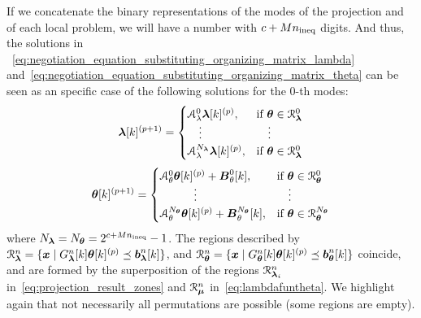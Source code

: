 \documentclass[../main.tex]{subfiles}
\begin{document}
If we concatenate the binary representations of the modes of the projection and of each local problem, we will have a number with $c+Mn_{\text{ineq}}$ digits.
And thus, the solutions in ~\eqref{eq:negotiation_equation_substituting_organizing_matrix_lambda} and~\eqref{eq:negotiation_equation_substituting_organizing_matrix_theta} can be seen as an specific case of the following solutions for the $0$-th modes:
\begin{equation}
  \label{eq:negotiation_equation_substituting_organizing_matrix_lambda_switched}
  \vec{\lambda}[k]\pplusone=
  \begin{cases}
    \mathcal{A}_{\lambda}^{0}\vec{\lambda}[k]\p,&\text{if}\ \vec{\theta} \in \set{R}_{\vec{\lambda}}^{0}\\
    \quad\vdots&\quad\vdots\\
    \mathcal{A}_{\lambda}^{N_{\vec{\lambda}}}\vec{\lambda}[k]\p,&\text{if}\ \vec{\theta}\in\set{R}_{\vec{\lambda}}^{0}\\
  \end{cases}
\end{equation}
\begin{equation}
  \label{eq:negotiation_equation_substituting_organizing_matrix_theta_switched}
  \vec{\theta}[k]\pplusone=
  \begin{cases}
    \mathcal{A}_{\theta}^{0}\vec{\theta}[k]\p+\mathcal{\vec{B}}_{\theta}^{0}[k],&\text{if}\ \vec{\theta}\in\set{R}_{\vec{\theta}}^{0}\\
    \qquad\quad \vdots&\quad \vdots\\
    \mathcal{A}_{\theta}^{N_{\vec{\theta}}}\vec{\theta}[k]\p+\mathcal{\vec{B}}_{\theta}^{N_{\vec{\theta}}}[k],&\text{if}\ \vec{\theta}\in\set{R}_{\vec{\theta}}^{N_{\vec{\theta}}}\\
  \end{cases}
\end{equation}
where $N_{\boldsymbol{\lambda}}=N_{\boldsymbol{\theta}}=2^{c+Mn_{\text{ineq}}}-1$.
The regions described by
 ${\mathcal{R}_{\boldsymbol{\lambda}}^{n}=\{\boldsymbol{x}\mid G_{\boldsymbol{\lambda}}^{n}[k]\boldsymbol{\theta}[k]^{(p)} \preceq \boldsymbol{b}_{\boldsymbol{\lambda}}^{n}[k]\}}$, and
 ${\mathcal{R}_{\boldsymbol{\theta}}^{n}=\{\boldsymbol{x}\mid G_{\boldsymbol{\theta}}^{n}[k]\boldsymbol{\theta}[k]^{(p)} \preceq \boldsymbol{b}_{\boldsymbol{\theta}}^{n}[k]\}}$
coincide, and are formed by the superposition of the regions $\mathcal{R}_{\boldsymbol{\lambda}_{i}}^{n}$ in~\eqref{eq:projection_result_zones} and $\mathcal{R}_{\boldsymbol{\mu}}^{n}$ in~\eqref{eq:lambdafuntheta}.
We highlight again that not necessarily all permutations are possible (some regions are empty).
\end{document}
